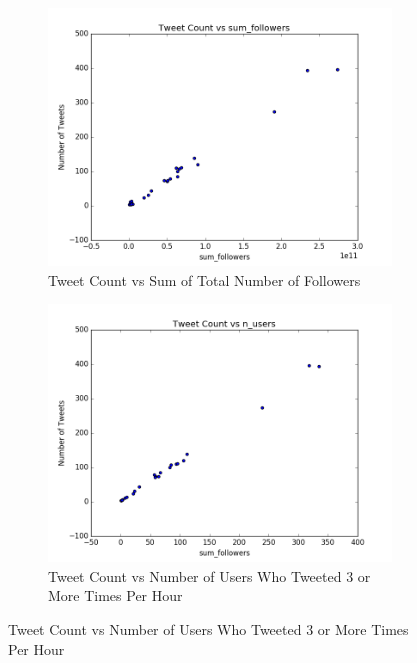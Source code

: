 \documentclass[12pt]{article}
\begin{document}
\begin{figure}[H]
\centering
\begin{subfigure}{.45\textwidth}
  \centering
\includegraphics[width=\textwidth]{figures/count_vs_sum_tweets_gohawks.png}
\caption{Tweet Count vs Sum of Total Number of Followers}
\label{part1:fig:LC}
\end{subfigure}%
\hfill
\begin{subfigure}{.45\textwidth}
  \centering
\includegraphics[width=\textwidth]{figures/count_vs_n_users_tweets_gohawks.png}
\caption{Tweet Count vs Number of Users Who Tweeted 3 or More Times Per Hour}
\label{part1:fig:LC}
\end{subfigure}


\end{figure}
\end{document}
